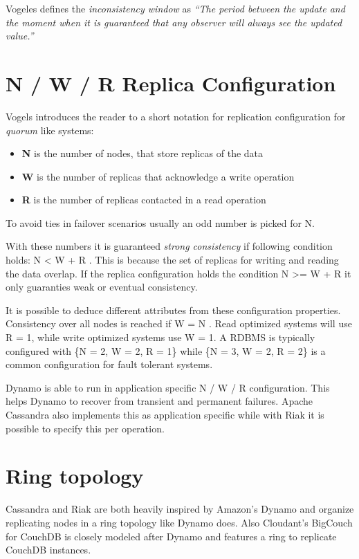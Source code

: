 Vogeles defines the \emph{inconsistency window} as
\emph{``The period between the update and the moment when it is guaranteed that any observer will always see the updated value.''}

\section{N / W / R Replica Configuration}

Vogels introduces the reader to a short notation for replication
configuration for \emph{quorum} like systems:

\begin{itemize}
\item
  \textbf{N} is the number of nodes, that store replicas of the data
\item
  \textbf{W} is the number of replicas that acknowledge a write
  operation
\item
  \textbf{R} is the number of replicas contacted in a read operation
\end{itemize}
To avoid ties in failover scenarios usually an odd number is picked
for N.

With these numbers it is guaranteed \emph{strong consistency} if
following condition holds: N \textless{} W + R . This is because the
set of replicas for writing and reading the data overlap. If the
replica configuration holds the condition  N \textgreater{}= W + R
it only guaranties weak or eventual consistency.

It is possible to deduce different attributes from these
configuration properties. Consistency over all nodes is reached if
W = N . Read optimized systems will use R = 1, while write optimized
systems use W = 1. A RDBMS is typically configured with \{N = 2, W = 2, R = 1\} 
\newline while \{N = 3, W = 2, R = 2\} is a common configuration for fault
tolerant systems.

Dynamo is able to run in application specific N / W / R
configuration. This helps Dynamo to recover from transient and
permanent failures. Apache Cassandra also implements this as application
specific while with Riak it is possible to specify this per operation.

\section{Ring topology}

Cassandra and Riak are both heavily inspired by Amazon's Dynamo and organize
replicating nodes in a ring topology like Dynamo does. Also Cloudant's BigCouch
\cite{bigcouch} for CouchDB is closely modeled after Dynamo
and features a ring to replicate CouchDB instances.

